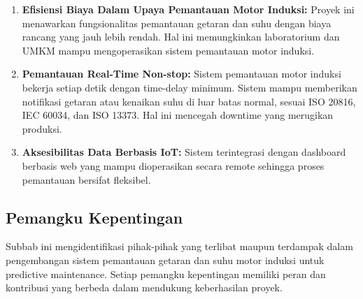 \documentclass{elsinta}
\begin{document}
\begin{enumerate}
    \item \textbf{Efisiensi Biaya Dalam Upaya Pemantauan Motor Induksi:} Proyek ini menawarkan fungsionalitas pemantauan getaran dan suhu dengan biaya rancang yang jauh lebih rendah. Hal ini memungkinkan laboratorium dan UMKM mampu mengoperasikan sistem pemantauan motor induksi.
    \item \textbf{Pemantauan Real-Time Non-stop:} Sistem pemantauan motor induksi bekerja setiap detik dengan time-delay minimum. Sistem mampu memberikan notifikasi getaran atau kenaikan suhu di luar batas normal, sesuai ISO 20816, IEC 60034, dan ISO 13373. Hal ini mencegah downtime yang merugikan produksi.
    \item \textbf{Aksesibilitas Data Berbasis IoT:} Sistem terintegrasi dengan dashboard berbasis web yang mampu dioperasikan secara remote sehingga proses pemantauan bersifat fleksibel.
\end{enumerate}


\subsection{Pemangku Kepentingan}

Subbab ini mengidentifikasi pihak-pihak yang terlibat maupun terdampak dalam pengembangan sistem pemantauan getaran dan suhu motor induksi untuk predictive maintenance. Setiap pemangku kepentingan memiliki peran dan kontribusi yang berbeda dalam mendukung keberhasilan proyek.
\end{document}
